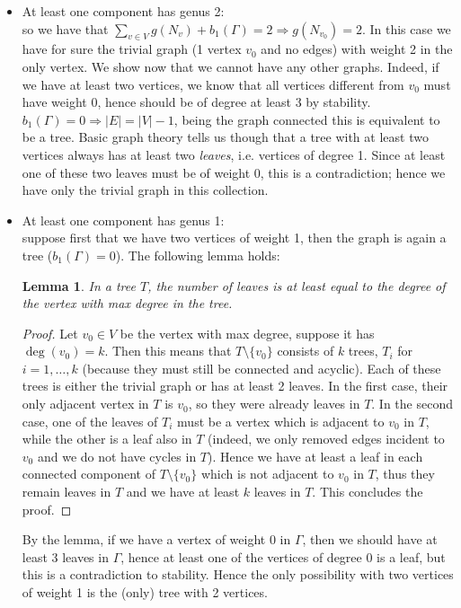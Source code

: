 \documentclass[a4paper,12 pt,titlepage,twoside]{book}
\theoremstyle{plain}
\theoremstyle{theorem}
\newtheorem{lemma}[thm]{Lemma}
\theoremstyle{definition}
\theoremstyle{remark}
\begin{document}
	\begin{itemize}
		\item At least one component has genus 2: \\so we have that $\sum_{v \in V} g(N_v) + b_1(\Gamma)= 2 \Rightarrow g(N_{v_0})=2.$ In this case we have for sure the trivial graph (1 vertex $v_0$ and no edges) with weight 2 in the only vertex. We show now that we cannot have any other graphs. Indeed, if we have at least two vertices, we know that all vertices different from $v_0$ must have weight 0, hence should be of degree at least 3 by stability. $b_1(\Gamma)=0 \Rightarrow |E| = |V| -1$, being the graph connected this is equivalent to be a tree. Basic graph theory tells us though that a tree with at least two vertices always has at least two \emph{leaves}, i.e. vertices of degree 1. Since at least one of these two leaves must be of weight 0, this is a contradiction; hence we have only the trivial graph in this collection.
		\item At least one component has genus 1: \\suppose first that we have two vertices of weight 1, then the graph is again a tree ($b_1(\Gamma)=0$). The following lemma holds:
		\begin{lemma}
			In a tree $T$, the number of leaves is at least equal to the degree of the vertex with max degree in the tree.
		\end{lemma}
		\begin{proof}
			Let $v_0 \in V$ be the vertex with max degree, suppose it has $\deg(v_0)=k$. Then this means that $T \setminus \{v_0\}$ consists of $k$ trees, $T_i$ for $i = 1, \dots, k$ (because they must still be connected and acyclic). Each of these trees is either the trivial graph or has at least 2 leaves. In the first case, their only adjacent vertex in $T$ is $v_0$, so they were already leaves in $T$. In the second case, one of the leaves of $T_i$ must be a vertex which is adjacent to $v_0$ in $T$, while the other is a leaf also in $T$ (indeed, we only removed edges incident to $v_0$ and we do not have cycles in $T$). Hence we have at least a leaf in each connected component of $T \setminus \{v_0\}$ which is not adjacent to $v_0$ in $T$, thus they remain leaves in $T$ and we have at least $k$ leaves in $T$. This concludes the proof.
		\end{proof}
		By the lemma, if we have a vertex of weight 0 in $\Gamma$, then we should have at least 3 leaves in $\Gamma$, hence at least one of the vertices of degree 0 is a leaf, but this is a contradiction to stability. Hence the only possibility with two vertices of weight 1 is the (only) tree with 2 vertices.
		

\end{itemize}
\end{document}
